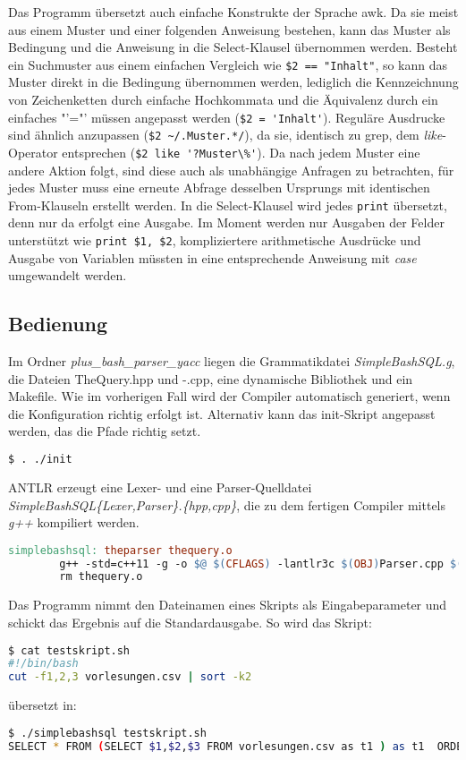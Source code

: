 Das Programm übersetzt auch einfache Konstrukte der Sprache awk. Da sie meist aus einem Muster und einer folgenden Anweisung bestehen, kann das Muster als Bedingung und die Anweisung in die Select-Klausel übernommen werden. Besteht ein Suchmuster aus einem einfachen Vergleich wie
\lstinline{$2 == "Inhalt"},
so kann das Muster direkt in die Bedingung übernommen werden, lediglich die Kennzeichnung von Zeichenketten durch einfache Hochkommata und die Äquivalenz durch ein einfaches "'="' müssen angepasst werden (\lstinline{$2 = 'Inhalt'}). Reguläre Ausdrucke sind ähnlich anzupassen (\lstinline{$2 ~/.Muster.*/}), da sie, identisch zu grep, dem \textit{like}-Operator entsprechen (\lstinline{$2 like '?Muster\%'}).
Da nach jedem Muster eine andere Aktion folgt, sind diese auch als unabhängige Anfragen zu betrachten, für jedes Muster muss eine erneute Abfrage desselben Ursprungs mit identischen From-Klauseln erstellt werden. In die Select-Klausel wird jedes \lstinline{print} übersetzt, denn nur da erfolgt eine Ausgabe. Im Moment werden nur Ausgaben der Felder unterstützt wie \lstinline{print $1, $2}, kompliziertere arithmetische Ausdrücke und Ausgabe von Variablen müssten in eine entsprechende Anweisung mit \textit{case} umgewandelt werden.

\subsection{Bedienung}
Im Ordner \textit{plus\_bash\_parser\_yacc} liegen die Grammatikdatei \textit{SimpleBashSQL.g}, die Dateien TheQuery.hpp und -.cpp, eine dynamische Bibliothek und ein Makefile. Wie im vorherigen Fall wird der Compiler automatisch generiert, wenn die Konfiguration richtig erfolgt ist. Alternativ kann das init-Skript angepasst werden, das die Pfade richtig setzt.
\begin{lstlisting}[language=Bash]
$ . ./init
\end{lstlisting}

ANTLR erzeugt eine Lexer- und eine Parser-Quelldatei \textit{SimpleBashSQL\{Lexer,Parser\}.\{hpp,cpp\}}, die zu dem fertigen Compiler mittels \textit{g++} kompiliert werden.

\begin{lstlisting}[language=make]
simplebashsql: theparser thequery.o
        g++ -std=c++11 -g -o $@ $(CFLAGS) -lantlr3c $(OBJ)Parser.cpp $(OBJ)Lexer.cpp thequery.o
        rm thequery.o
\end{lstlisting}

Das Programm nimmt den Dateinamen eines Skripts als Eingabeparameter und schickt das Ergebnis auf die Standardausgabe. So wird das Skript:
\begin{lstlisting}[language=Bash]
$ cat testskript.sh
#!/bin/bash
cut -f1,2,3 vorlesungen.csv | sort -k2
\end{lstlisting}
übersetzt in:
\begin{lstlisting}[language=Bash]
$ ./simplebashsql testskript.sh
SELECT * FROM (SELECT $1,$2,$3 FROM vorlesungen.csv as t1 ) as t1  ORDER BY $2
\end{lstlisting}


